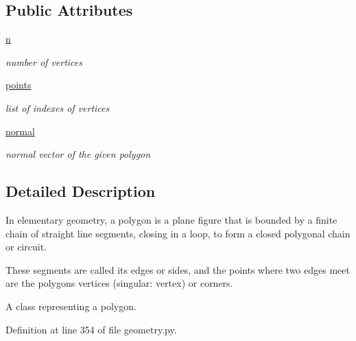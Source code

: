 \subsection*{Public Attributes}
\begin{DoxyCompactItemize}
\item 
\mbox{\label{classgeometry_1_1Polygon_a4491c008a2f035119ca3f56d38afd0cf}} 
\hyperlink{classgeometry_1_1Polygon_a4491c008a2f035119ca3f56d38afd0cf}{n}
\begin{DoxyCompactList}\small\item\em number of vertices \end{DoxyCompactList}\item 
\mbox{\label{classgeometry_1_1Polygon_aa0fda1ff74a09b8498bd7d8731b2fbf1}} 
\hyperlink{classgeometry_1_1Polygon_aa0fda1ff74a09b8498bd7d8731b2fbf1}{points}
\begin{DoxyCompactList}\small\item\em list of indexes of vertices \end{DoxyCompactList}\item 
\mbox{\label{classgeometry_1_1Polygon_a904adb19928f3de57ee46d4410c527e3}} 
\hyperlink{classgeometry_1_1Polygon_a904adb19928f3de57ee46d4410c527e3}{normal}
\begin{DoxyCompactList}\small\item\em normal vector of the given polygon \end{DoxyCompactList}\end{DoxyCompactItemize}


\subsection{Detailed Description}
In elementary geometry, a polygon is a plane figure that is bounded by a finite chain of straight line segments, closing in a loop, to form a closed polygonal chain or circuit. 

These segments are called its edges or sides, and the points where two edges meet are the polygon\textquotesingle{}s vertices (singular\+: vertex) or corners. \begin{DoxyVerb}A class representing a polygon.\end{DoxyVerb}
 

Definition at line 354 of file geometry.\+py.



